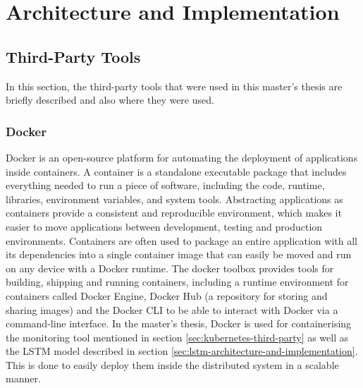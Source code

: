 \chapter{Architecture and Implementation}
\label{ch:architecture-and-implementation}

\section{Third-Party Tools}
\label{sec:third-party-tools-architecture}

  In this section, the third-party tools that were used in this master's thesis are briefly described and also where they were used.

\subsection{Docker}
\label{sec:docker-third-party}

  Docker is an open-source platform for automating the deployment of applications inside containers. A container is a standalone executable package that includes everything needed to run a piece of software, including the code, runtime, libraries, environment variables, and system tools.
  Abstracting applications as containers provide a consistent and reproducible environment, which makes it easier to move applications between development, testing and production environments.
  Containers are often used to package an entire application with all its dependencies into a single container image that can easily be moved and run on any device with a Docker runtime.
  The docker toolbox provides tools for building, shipping and running containers, including a runtime environment for containers called Docker Engine, Docker Hub (a repository for storing and sharing images) and the Docker CLI to be able to interact with Docker via a command-line interface.
  In the master's thesis, Docker is used for containerising the monitoring tool mentioned in section \ref{sec:kubernetes-third-party} as well as the LSTM model described in section \ref{sec:lstm-architecture-and-implementation}.
  This is done to easily deploy them inside the distributed system in a scalable manner. 

